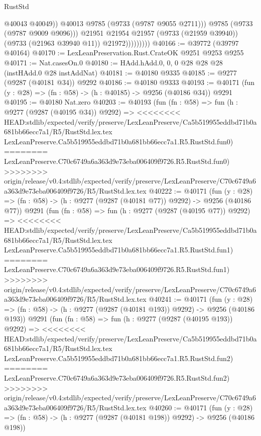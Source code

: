 \begin{lexlean}{RustStd}
\begin{coremodule}
{\begin{coremodule}
{{{{{{{{{{{{{{{{{{{{{{{{{{{{{{{{{{{{{{{{{{{{{{{{{{{{{{{                              @40043
                              @40049))
                          @40013
                          @9785
                          (@9733 (@9787 @9055 @2711)))
                        @9785
                        (@9733 (@9787 @9009 @9096)))
                      @21951
                      @21954
                      @21957
                      (@9733 (@21959 @39940))
                      (@9733 (@21963 @39940 @11))
                      @21972)))))))))
@40166 := @39772 (@39797 @40164)
@40170 := LexLeanPreservation.Rust.CrateOK @9251 @9253 @9255
@40171 := Nat.casesOn.{0}
@40180 := HAdd.hAdd.{0, 0, 0} @28 @28 @28 (instHAdd.{0} @28 instAddNat)
@40181 := @40180 @9335
@40185 := @9277 (@9287 (@40181 @34)) @9292
@40186 := @40180 @9333
@40193 := @40171 (fun (y : @28) => (fn : @58) -> (h : @40185) -> @9256 (@40186 @34)) @9291
@40195 := @40180 Nat.zero
@40203 := @40193
    (fun (fn : @58) =>
    fun (h : @9277 (@9287 (@40195 @34)) @9292) =>
<<<<<<<< HEAD:stdlib/expected/verify/preserve/LexLeanPreserve/Ca5b519955eddbd71b0a681bb66ecc7a1/R5/RustStd.lex.tex
    LexLeanPreserve.Ca5b519955eddbd71b0a681bb66ecc7a1.R5.RustStd.fun0)
========
    LexLeanPreserve.C70c6749a6a363d9e73eba006409f9726.R5.RustStd.fun0)
>>>>>>>> origin/release/v0.4:stdlib/expected/verify/preserve/LexLeanPreserve/C70c6749a6a363d9e73eba006409f9726/R5/RustStd.lex.tex
@40222 := @40171
    (fun (y : @28) => (fn : @58) -> (h : @9277 (@9287 (@40181 @77)) @9292) -> @9256 (@40186 @77))
    @9291
    (fun (fn : @58) =>
    fun (h : @9277 (@9287 (@40195 @77)) @9292) =>
<<<<<<<< HEAD:stdlib/expected/verify/preserve/LexLeanPreserve/Ca5b519955eddbd71b0a681bb66ecc7a1/R5/RustStd.lex.tex
    LexLeanPreserve.Ca5b519955eddbd71b0a681bb66ecc7a1.R5.RustStd.fun1)
========
    LexLeanPreserve.C70c6749a6a363d9e73eba006409f9726.R5.RustStd.fun1)
>>>>>>>> origin/release/v0.4:stdlib/expected/verify/preserve/LexLeanPreserve/C70c6749a6a363d9e73eba006409f9726/R5/RustStd.lex.tex
@40241 := @40171
    (fun (y : @28) => (fn : @58) -> (h : @9277 (@9287 (@40181 @193)) @9292) -> @9256 (@40186 @193))
    @9291
    (fun (fn : @58) =>
    fun (h : @9277 (@9287 (@40195 @193)) @9292) =>
<<<<<<<< HEAD:stdlib/expected/verify/preserve/LexLeanPreserve/Ca5b519955eddbd71b0a681bb66ecc7a1/R5/RustStd.lex.tex
    LexLeanPreserve.Ca5b519955eddbd71b0a681bb66ecc7a1.R5.RustStd.fun2)
========
    LexLeanPreserve.C70c6749a6a363d9e73eba006409f9726.R5.RustStd.fun2)
>>>>>>>> origin/release/v0.4:stdlib/expected/verify/preserve/LexLeanPreserve/C70c6749a6a363d9e73eba006409f9726/R5/RustStd.lex.tex
@40260 := @40171
    (fun (y : @28) => (fn : @58) -> (h : @9277 (@9287 (@40181 @198)) @9292) -> @9256 (@40186 @198))
}}}}}}}}}}}}}}}}}}}}}}}}}}}}}}}}}}}}}}}}}}}}}}}}}}}}}}}
\end{coremodule}}
\end{coremodule}
\end{lexlean}
